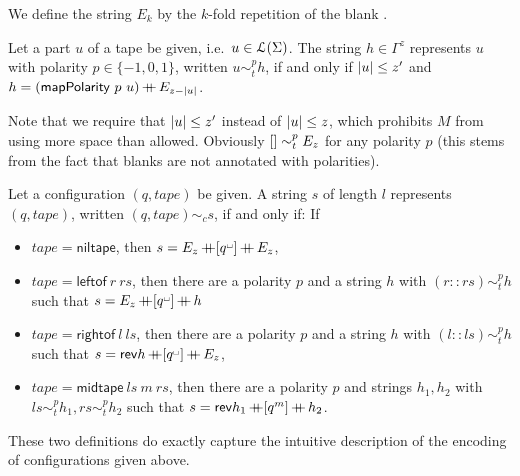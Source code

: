 \documentclass[a4paper,UKenglish,cleveref, autoref]{lipics-v2019}
\begin{document}
\newcommand{\reprt}[1]{\ensuremath{\sim_t^{#1}}}
\newcommand{\reprc}{\ensuremath{\sim_c}}

We define the string $E_k$ by the $k$-fold repetition of the blank \blank.

\begin{definition}
  Let a part $u$ of a tape be given, i.e.\ $u \in \mathcal{L} (\Sigma)$. The string $h \in \Gamma^{z}$ represents $u$ with polarity $p \in \{-1, 0, 1\}$, written $u \reprt{p} h$, if and only if $|u| \le z' $ and $h = (\textsf{mapPolarity}~p~u) \mathop{{+}\!\!\!{+}} E_{z-|u|}$.
\end{definition}

Note that we require that $|u| \le z'$ instead of $|u| \le z$, which prohibits $M$ from using more space than allowed. 
Obviously $\nil \reprt{p} E_{z}$ for any polarity $p$ (this stems from the fact that blanks are not annotated with polarities).

\begin{definition}
  Let a configuration $(q, \mathit{tape})$ be given. A string $s$ of length $l$ represents $(q, \mathit{tape})$, written $(q, \mathit{tape}) \reprc s$, if and only if: If
  \begin{itemize}
    \item $\mathit{tape} = \textsf{niltape}$, then $s =  E_z \concat [q^\blank] \concat E_z$, 
    \item $\mathit{tape} = \textsf{leftof}~r~rs$, then there are a polarity $p$ and a string $h$ with $(r :: rs) \reprt{p} h$ such that $s = E_z \concat [q^\blank] \concat h$
    \item $\mathit{tape} = \textsf{rightof}~l~ls$, then there are a polarity $p$ and a string $h$ with $(l::ls) \reprt{p} h$ such that $s = \rev{h} \concat [q^\blank] \concat E_z$, 
    \item $\mathit{tape} = \textsf{midtape}~ls~m~rs$, then there are a polarity $p$ and strings $h_1, h_2$ with $ls \reprt{p} h_1, rs \reprt{p} h_2$ such that $s = \mathsf{rev}{h_1} \mathop{{+}\!\!\!{+}} [q^m] \mathop{{+}\!\!\!{+}} h_2$. 
  \end{itemize}
\end{definition}

These two definitions do exactly capture the intuitive description of the encoding of configurations given above. 
\end{document}
